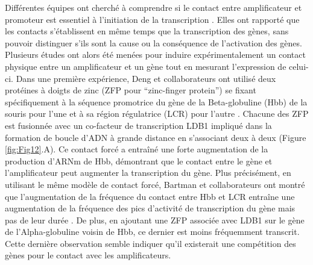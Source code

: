 Différentes équipes ont cherché à comprendre si le contact entre \gls{amplificateur} et promoteur est essentiel à l’initiation de la transcription \citep{carter_long-range_2002}. Elles ont rapporté que les contacts s'établissent en même temps que la transcription des gènes, sans pouvoir distinguer s’ils sont la cause ou la conséquence de l'activation des gènes. Plusieurs études ont alors été menées pour induire expérimentalement un contact physique entre un \gls{amplificateur} et un gène tout en mesurant l’expression de celui-ci. Dans une première expérience, Deng et collaborateurs ont utilisé deux protéines à doigts de zinc (ZFP pour “zinc-finger protein”) se fixant spécifiquement à la séquence promotrice du gène de la Beta-globuline (Hbb) de la souris pour l’une et à sa région régulatrice (LCR) pour l’autre \citep{deng_controlling_2012}. Chacune des ZFP est fusionnée avec un co-facteur de transcription LDB1 impliqué dans la formation de boucle d’ADN à grande distance en s’associant deux à deux (Figure \ref{fig:Fig12}.A). Ce contact forcé a entraîné une forte augmentation de la production d’\acrshort{ARNm} de Hbb, démontrant que le contact entre le gène et l’\gls{amplificateur} peut augmenter la transcription du gène. Plus précisément, en utilisant le même modèle de contact forcé, Bartman et collaborateurs ont montré que l’augmentation de la fréquence du contact entre Hbb et LCR entraîne une augmentation de la fréquence des pics d’activité de transcription du gène mais pas de leur durée \citep{bartman_enhancer_2016}. De plus, en ajoutant une ZFP associée avec LDB1 sur le gène de l’Alpha-globuline voisin de Hbb, ce dernier est moins fréquemment transcrit. Cette dernière observation semble indiquer qu’il existerait une compétition des gènes pour le contact avec les \glspl{amplificateur}.

